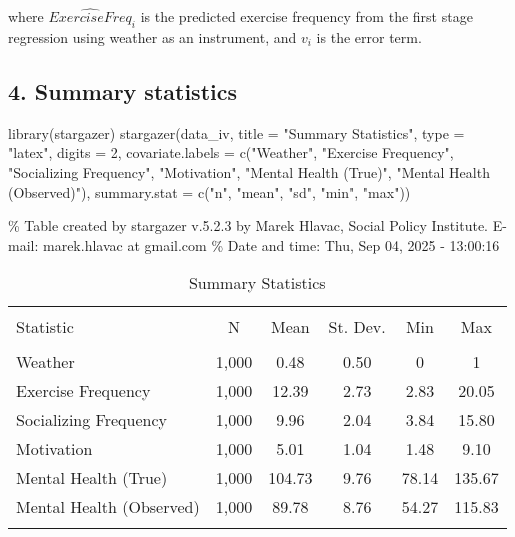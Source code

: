 \documentclass[
  letterpaper,
  DIV=11,
  numbers=noendperiod]{scrartcl}
\newenvironment{Shaded}{\begin{snugshade}}{\end{snugshade}}
\newcommand{\AttributeTok}[1]{\textcolor[rgb]{0.40,0.45,0.13}{#1}}
\newcommand{\DecValTok}[1]{\textcolor[rgb]{0.68,0.00,0.00}{#1}}
\newcommand{\FunctionTok}[1]{\textcolor[rgb]{0.28,0.35,0.67}{#1}}
\newcommand{\NormalTok}[1]{\textcolor[rgb]{0.00,0.23,0.31}{#1}}
\newcommand{\StringTok}[1]{\textcolor[rgb]{0.13,0.47,0.30}{#1}}
\begin{document}
where \(\hat{ExerciseFreq}_i\) is the predicted exercise frequency from
the first stage regression using weather as an instrument, and \(v_i\)
is the error term.

\subsection{4. Summary statistics}\label{summary-statistics-1}

\begin{Shaded}
\begin{Highlighting}[]
\FunctionTok{library}\NormalTok{(stargazer)}
\FunctionTok{stargazer}\NormalTok{(data\_iv, }
  \AttributeTok{title =} \StringTok{"Summary Statistics"}\NormalTok{, }
  \AttributeTok{type =} \StringTok{"latex"}\NormalTok{, }\AttributeTok{digits =} \DecValTok{2}\NormalTok{,}
  \AttributeTok{covariate.labels =} \FunctionTok{c}\NormalTok{(}\StringTok{"Weather"}\NormalTok{, }\StringTok{"Exercise Frequency"}\NormalTok{, }\StringTok{"Socializing Frequency"}\NormalTok{, }\StringTok{"Motivation"}\NormalTok{, }\StringTok{"Mental Health (True)"}\NormalTok{, }\StringTok{"Mental Health (Observed)"}\NormalTok{),}
  \AttributeTok{summary.stat =} \FunctionTok{c}\NormalTok{(}\StringTok{"n"}\NormalTok{, }\StringTok{"mean"}\NormalTok{, }\StringTok{"sd"}\NormalTok{, }\StringTok{"min"}\NormalTok{, }\StringTok{"max"}\NormalTok{))}
\end{Highlighting}
\end{Shaded}

\% Table created by stargazer v.5.2.3 by Marek Hlavac, Social Policy
Institute. E-mail: marek.hlavac at gmail.com \% Date and time: Thu, Sep
04, 2025 - 13:00:16

\begin{table}[!htbp] \centering 
  \caption{Summary Statistics} 
  \label{} 
\begin{tabular}{@{\extracolsep{5pt}}lccccc} 
\\[-1.8ex]\hline 
\hline \\[-1.8ex] 
Statistic & \multicolumn{1}{c}{N} & \multicolumn{1}{c}{Mean} & \multicolumn{1}{c}{St. Dev.} & \multicolumn{1}{c}{Min} & \multicolumn{1}{c}{Max} \\ 
\hline \\[-1.8ex] 
Weather & 1,000 & 0.48 & 0.50 & 0 & 1 \\ 
Exercise Frequency & 1,000 & 12.39 & 2.73 & 2.83 & 20.05 \\ 
Socializing Frequency & 1,000 & 9.96 & 2.04 & 3.84 & 15.80 \\ 
Motivation & 1,000 & 5.01 & 1.04 & 1.48 & 9.10 \\ 
Mental Health (True) & 1,000 & 104.73 & 9.76 & 78.14 & 135.67 \\ 
Mental Health (Observed) & 1,000 & 89.78 & 8.76 & 54.27 & 115.83 \\ 
\hline \\[-1.8ex] 
\end{tabular} 
\end{table}
\end{document}
